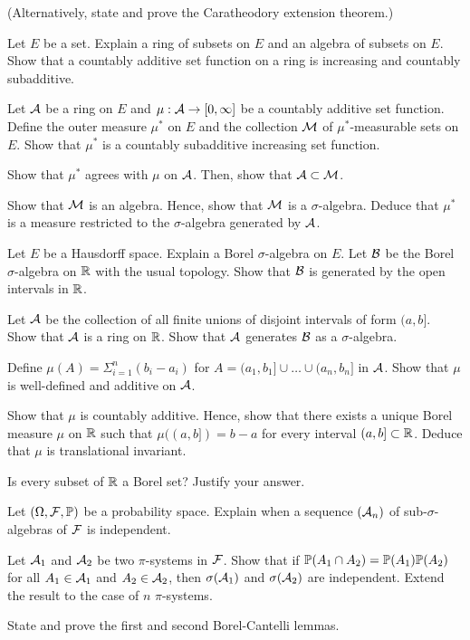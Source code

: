 \begin{question}{3}
(Alternatively, state and prove the Caratheodory extension theorem.)

Let $E$ be a set. Explain a ring of subsets on $E$ and an algebra of subsets on $E$. Show that a countably additive set function on a ring is increasing and countably subadditive.

Let $\curA$ be a ring on $E$ and $\mu : \curA \rightarrow [0,\infty]$ be a countably additive set function. Define the outer measure $\mu^*$ on $E$ and the collection $\curM$ of $\mu^*$-measurable sets on $E$. Show that $\mu^*$ is a countably subadditive increasing set function.

Show that $\mu^*$ agrees with $\mu$ on $\curA$. Then, show that $\curA \subset \curM$.

Show that $\curM$ is an algebra. Hence, show that $\curM$ is a $\sigma$-algebra. Deduce that $\mu^*$ is a measure restricted to the $\sigma$-algebra generated by $\curA$.
\end{question}

\begin{question}{4}
Let $E$ be a Hausdorff space. Explain a Borel $\sigma$-algebra on $E$. Let $\curB$ be the Borel $\sigma$-algebra on $\R$ with the usual topology. Show that $\curB$ is generated by the open intervals in $\R$.

Let $\curA$ be the collection of all finite unions of disjoint intervals of form $(a,b]$. Show that $\curA$ is a ring on $\R$. Show that $\curA$ generates $\curB$ as a $\sigma$-algebra.

Define $\mu(A) = \Sigma_{i=1}^n (b_i - a_i)$ for $A = (a_1,b_1] \cup \dots \cup (a_n,b_n]$ in $\curA$. Show that $\mu$ is well-defined and additive on $\curA$.

 Show that  $\mu$ is countably additive.  Hence, show that there exists a unique Borel measure $\mu$ on $\R$ such that $\mu((a,b]) = b-a$ for every interval $(a,b] \subset \R$. Deduce that $\mu$ is translational invariant.

Is every subset of $\R$ a Borel set? Justify your answer. 
\end{question}

\begin{question}{5}
Let $(\Omega, \curF,\P)$ be a probability space. Explain when a sequence $(\curA_n)$ of sub-$\sigma$-algebras of $\curF$ is independent.

Let $\curA_1$ and $\curA_2$ be two $\pi$-systems in $\curF$. Show that if $\P(A_1 \cap A_2) = \P(A_1) \P(A_2)$ for all $A_1 \in \curA_1$ and $A_2 \in \curA_2$, then $\sigma(\curA_1)$ and $\sigma(\curA_2)$ are independent. Extend the result to the case of $n$ $\pi$-systems.

State and prove the first and second Borel-Cantelli lemmas.
\end{question}

